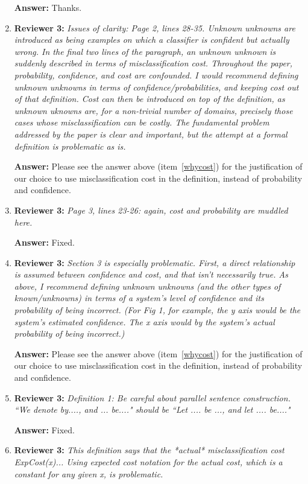 \documentclass[letterpaper]{article}
\begin{document}
\begin{enumerate}
\textbf{Answer:} Thanks.

\item \textbf{Reviewer 3:} \emph{ Issues of clarity: Page 2, lines 28-35.  Unknown unknowns are introduced as being examples on which a classifier is confident but actually wrong.  In the final two lines of the paragraph, an unknown unknown is suddenly described in terms of misclassification cost.  Throughout the paper, probability, confidence, and cost are confounded.  I would recommend defining unknown unknowns in terms of confidence/probabilities, and keeping cost out of that definition. Cost can then be introduced on top of the definition, as unknown uknowns are, for a non-trivial number of domains, precisely those cases whose misclassification can be costly.  The fundamental problem addressed by the paper is clear and important, but the attempt at a formal definition is problematic as is.}

\textbf{Answer:} Please see the answer above (item~\ref{whycost}) for the justification of our choice to use misclassification cost in the definition, instead of probability and confidence. 

\item \textbf{Reviewer 3:} \emph{ Page 3, lines 23-26: again, cost and probability are muddled here.}

\textbf{Answer:} Fixed.

\item \textbf{Reviewer 3:} \emph{ Section 3 is especially problematic.  First, a direct relationship is assumed between confidence and cost, and that isn't necessarily true. As above, I recommend defining unknown unknowns (and the other types of known/unknowns) in terms of a system's level of confidence and its probability of being incorrect.  (For Fig 1, for example, the y axis would be the system's estimated confidence.  The x axis would by the system's actual probability of being incorrect.)}

\textbf{Answer:} Please see the answer above (item~\ref{whycost}) for the justification of our choice to use misclassification cost in the definition, instead of probability and confidence. 

\item \textbf{Reviewer 3:} \emph{Definition 1: Be careful about parallel sentence construction.  ``We denote by...., and ... be...." should be ``Let .... be ..., and let .... be...."}

\textbf{Answer:} Fixed.

\item \textbf{Reviewer 3:} \emph{ This definition says that the *actual* misclassification cost ExpCost(x)... Using expected cost notation for the actual cost, which is a constant for any given x, is problematic.}


\end{enumerate}
\end{document}
